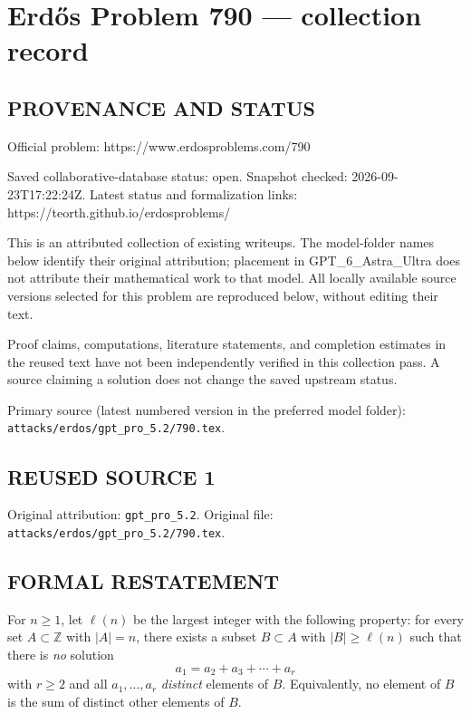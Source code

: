 \section*{Erd\H{o}s Problem 790 --- collection record}

\subsection*{PROVENANCE AND STATUS}
Official problem: https://www.erdosproblems.com/790

Saved collaborative-database status: open.
Snapshot checked: 2026-09-23T17:22:24Z.
Latest status and formalization links: https://teorth.github.io/erdosproblems/

This is an attributed collection of existing writeups. The model-folder names below identify their original attribution; placement in GPT\_6\_Astra\_Ultra does not attribute their mathematical work to that model. All locally available source versions selected for this problem are reproduced below, without editing their text.

Proof claims, computations, literature statements, and completion estimates in the reused text have not been independently verified in this collection pass. A source claiming a solution does not change the saved upstream status.

Primary source (latest numbered version in the preferred model folder): \texttt{attacks/erdos/gpt\_pro\_5.2/790.tex}.

\subsection*{REUSED SOURCE 1}
Original attribution: \texttt{gpt\_pro\_5.2}.
Original file: \texttt{attacks/erdos/gpt\_pro\_5.2/790.tex}.


\subsection*{FORMAL RESTATEMENT}
For $n\ge 1$, let $\ell(n)$ be the largest integer with the following property:
for every set $A\subset \mathbb Z$ with $|A|=n$, there exists a subset $B\subset A$ with
$|B|\ge \ell(n)$ such that there is \emph{no} solution
\[
 a_1 = a_2 + a_3 + \cdots + a_r
\]
with $r\ge 2$ and all $a_1,\dots,a_r$ \emph{distinct} elements of $B$.
Equivalently, no element of $B$ is the sum of distinct other elements of $B$.

